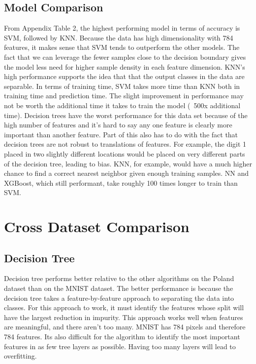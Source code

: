 \documentclass{article}
\begin{document}
\subsection{Model Comparison}
From Appendix Table 2, the highest performing model in terms of accuracy is SVM, followed by KNN. Because the data has high dimensionality with 784 features, it makes sense that SVM tends to outperform the other models. The fact that we can leverage the fewer samples close to the decision boundary gives the model less need for higher sample density in each feature dimension. KNN's high performance supports the idea that that the output classes in the data are separable. In terms of training time, SVM takes more time than KNN both in training time and prediction time. The slight improvement in performance may not be worth the additional time it takes to train the model (~500x additional time). Decision trees have the worst performance for this data set because of the high number of features and it's hard to say any one feature is clearly more important than another feature. Part of this also has to do with the fact that decision trees are not robust to translations of features. For example, the digit 1 placed in two slightly different locations would be placed on very different parts of the decision tree, leading to bias. KNN, for example, would have a much higher chance to find a correct nearest neighbor given enough training samples. NN and XGBoost, which still performant, take roughly 100 times longer to train than SVM. 

\section{Cross Dataset Comparison}
\subsection{Decision Tree}
Decision tree performs better relative to the other algorithms on the Poland dataset than on the MNIST dataset. The better performance is because the decision tree takes a feature-by-feature approach to separating the data into classes. For this approach to work, it must identify the features whose split will have the largest reduction in impurity. This approach works well when features are meaningful, and there aren't too many. MNIST has 784 pixels and therefore 784 features. Its also difficult for the algorithm to identify the most important features in as few tree layers as possible. Having too many layers will lead to overfitting. 
\end{document}
